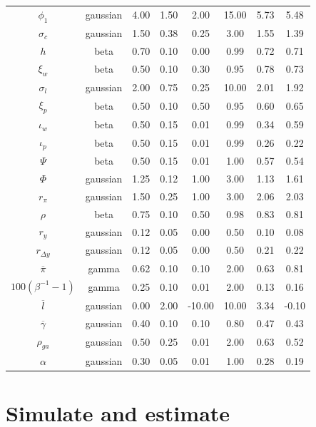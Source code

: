 \documentclass[11pt]{article}
\begin{document}
\begin{table}
\begin{tabular}[t]{cccccccc}
$\phi_1$ & gaussian & 4.00 & 1.50 & 2.00 & 15.00 & 5.73 & 5.48\\
$\sigma_c$ & gaussian & 1.50 & 0.38 & 0.25 & 3.00 & 1.55 & 1.39\\
$h$ & beta & 0.70 & 0.10 & 0.00 & 0.99 & 0.72 & 0.71\\
$\xi_w$ & beta & 0.50 & 0.10 & 0.30 & 0.95 & 0.78 & 0.73\\
\addlinespace
$\sigma_l$ & gaussian & 2.00 & 0.75 & 0.25 & 10.00 & 2.01 & 1.92\\
$\xi_p$ & beta & 0.50 & 0.10 & 0.50 & 0.95 & 0.60 & 0.65\\
$\iota_w$ & beta & 0.50 & 0.15 & 0.01 & 0.99 & 0.34 & 0.59\\
$\iota_p$ & beta & 0.50 & 0.15 & 0.01 & 0.99 & 0.26 & 0.22\\
$\Psi$ & beta & 0.50 & 0.15 & 0.01 & 1.00 & 0.57 & 0.54\\
\addlinespace
$\Phi$ & gaussian & 1.25 & 0.12 & 1.00 & 3.00 & 1.13 & 1.61\\
$r_\pi$ & gaussian & 1.50 & 0.25 & 1.00 & 3.00 & 2.06 & 2.03\\
$\rho$ & beta & 0.75 & 0.10 & 0.50 & 0.98 & 0.83 & 0.81\\
$r_y$ & gaussian & 0.12 & 0.05 & 0.00 & 0.50 & 0.10 & 0.08\\
$r_{\Delta y}$ & gaussian & 0.12 & 0.05 & 0.00 & 0.50 & 0.21 & 0.22\\
\addlinespace
$\overline{\pi}$ & gamma & 0.62 & 0.10 & 0.10 & 2.00 & 0.63 & 0.81\\
$100(\beta^{-1} -1)$ & gamma & 0.25 & 0.10 & 0.01 & 2.00 & 0.13 & 0.16\\
$\overline{l}$ & gaussian & 0.00 & 2.00 & -10.00 & 10.00 & 3.34 & -0.10\\
$\overline{\gamma}$ & gaussian & 0.40 & 0.10 & 0.10 & 0.80 & 0.47 & 0.43\\
$\rho_{ga}$ & gaussian & 0.50 & 0.25 & 0.01 & 2.00 & 0.63 & 0.52\\
\addlinespace
$\alpha$ & gaussian & 0.30 & 0.05 & 0.01 & 1.00 & 0.28 & 0.19\\
\bottomrule
\end{tabular}
\end{table}

\clearpage

\hypertarget{sec:simulate-estimate}{%
\section{Simulate and estimate}\label{sec:simulate-estimate}}
\end{document}
